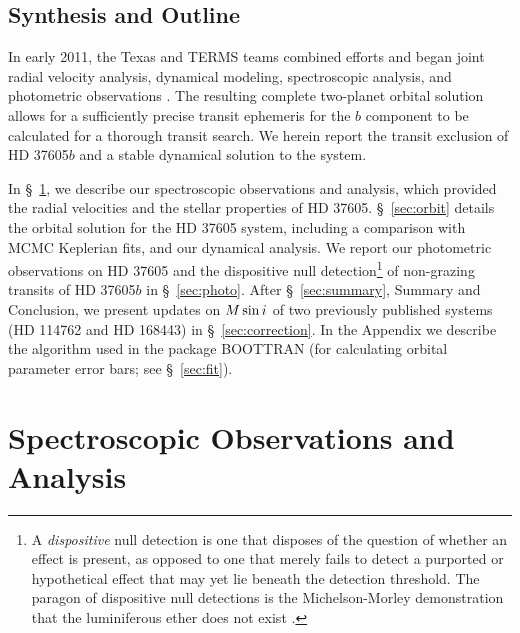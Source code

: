 \subsection{Synthesis and Outline}

In early 2011, the Texas and TERMS teams combined efforts and began
joint radial velocity analysis, dynamical modeling, spectroscopic
analysis, and photometric observations \citep{terms2012aas}. The
resulting complete two-planet orbital solution allows for a
sufficiently precise transit ephemeris for the $b$ component to be
calculated for a thorough transit search. We herein report the transit
exclusion of HD 37605$b$ and a stable dynamical solution to the
system.

In \S~\ref{sec:spec}, we describe our spectroscopic observations and
analysis, which provided the radial velocities and the stellar
properties of HD 37605. \S~\ref{sec:orbit} details the orbital
solution for the HD 37605 system, including a comparison with MCMC
Keplerian fits, and our dynamical analysis. We report our photometric
observations on HD 37605 and the dispositive null detection\footnote{A
  {\em dispositive} null detection is one that disposes of the
  question of whether an effect is present, as opposed to one that
  merely fails to detect a purported or hypothetical effect that may
  yet lie beneath the detection threshold.  The paragon of dispositive
  null detections is the Michelson-Morley demonstration that the
  luminiferous ether does not exist \citep{michelson1887}.} of
non-grazing transits of HD 37605$b$ in \S~\ref{sec:photo}. After
\S~\ref{sec:summary}, Summary and Conclusion, we present updates on
$M\sin{i}$ of two previously published systems (HD 114762 and HD 168443)
in \S~\ref{sec:correction}. In the Appendix we describe the algorithm
used in the package BOOTTRAN (for calculating orbital parameter error
bars; see \S~\ref{sec:fit}).



\section{Spectroscopic Observations and Analysis}\label{sec:spec}
